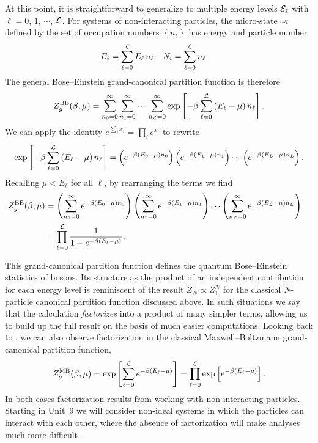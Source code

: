 At this point, it is straightforward to generalize to multiple energy levels $\mathcal E_{\ell}$ with $\ell = 0$, $1$, $\cdots$, $\mathcal L$.
For systems of non-interacting particles, the micro-state $\omega_i$ defined by the set of occupation numbers $\left\{n_{\ell}\right\}$ has energy and particle number
\begin{align}
  \label{eq:total_energy_levels}
  E_i & = \sum_{\ell = 0}^{\mathcal L} E_{\ell} \, n_{\ell} &
  N_i & = \sum_{\ell = 0}^{\mathcal L} n_{\ell}.
\end{align}
The general Bose--Einstein grand-canonical partition function is therefore
\begin{equation*}
  Z_g^{\text{BE}}(\beta, \mu) = \sum_{n_0 = 0}^{\infty} \sum_{n_1 = 0}^{\infty} \cdots \sum_{n_{\mathcal L} = 0}^{\infty} \exp\left[-\beta\sum_{\ell = 0}^{\mathcal L} \left(E_{\ell} - \mu\right) n_{\ell}\right].
\end{equation*}
We can apply the identity $e^{\sum_i x_i} = \prod_i e^{x_i}$ to rewrite
\begin{equation*}
  \exp\left[-\beta\sum_{\ell = 0}^{\mathcal L} \left(E_{\ell} - \mu\right) n_{\ell}\right] = \left(e^{-\beta (E_0 - \mu) n_0}\right) \left(e^{-\beta (E_1 - \mu) n_1}\right)\cdots \left(e^{-\beta (E_L - \mu) n_L}\right).
\end{equation*}
Recalling $\mu < E_{\ell}$ for all $\ell$, by rearranging the terms we find
\begin{align}
  Z_g^{\text{BE}}(\beta, \mu) & = \left(\sum_{n_0 = 0}^{\infty} e^{-\beta (E_0 - \mu) n_0}\right) \left(\sum_{n_1 = 0}^{\infty} e^{-\beta (E_1 - \mu) n_1}\right)\cdots \left(\sum_{n_{\mathcal L} = 0}^{\infty} e^{-\beta (E_{\mathcal L} - \mu) n_{\mathcal L}}\right) \cr
                 & = \prod_{\ell = 0}^{\mathcal L} \frac{1}{1 - e^{-\beta (E_{\ell} - \mu)}}. \label{eq:partfunc_BE}
\end{align}

This grand-canonical partition function defines the quantum Bose--Einstein statistics of bosons.
Its structure as the product of an independent contribution for each energy level is reminiscent of the result $Z_N \propto Z_1^N$ for the classical $N$-particle canonical partition function discussed above.
In such situations we say that the calculation \textit{factorizes} into a product of many simpler terms, allowing us to build up the full result on the basis of much easier computations.
Looking back to , we can also observe factorization in the classical Maxwell--Boltzmann grand-canonical partition function,
\begin{equation}
  \label{eq:partfunc_MB}
  Z_g^{\text{MB}}(\beta, \mu) = \exp\left[\sum_{\ell = 0}^{\mathcal L} e^{-\beta\left(E_{\ell} - \mu\right)}\right] = \prod_{\ell = 0}^{\mathcal L} \exp\left[e^{-\beta\left(E_{\ell} - \mu\right)}\right].
\end{equation}
In both cases factorization results from working with non-interacting particles.
Starting in Unit~9 we will consider non-ideal systems in which the particles can interact with each other, where the absence of factorization will make analyses much more difficult.



